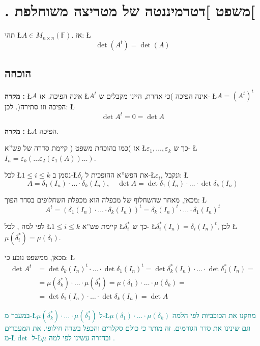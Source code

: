 \documentclass[english,hebrew]{article}
\begin{document}
\section{{\endL}. משפט {]}דטרמיננטה של מטריצה משוחלפת{[}}

תהי \L{$A\in M_{n\times n}(\mathbb{F})$}. אז: \L{%
\[
\det(A^{t})=\det(A)
\]
}%

\subsection{הוכחה}

\textbf{מקרה }\textbf{{}\endL}\textbf{:} \L{$A$} אינה הפיכה.
אז \L{$A^{t}$} אינה הפיכה )כי אחרת, היינו מקבלים ש- \L{$A=(A^{t})^{t}$}
הפיכה וזו סתירה(. לכן: \L{%
\[
\det A^{t}=0=\det A
\]
}%

\textbf{מקרה }\textbf{{}\endL}\textbf{:} \L{$A$} הפיכה.

אז )כמו בהוכחת משפט {\endL}( קיימת סדרה של פש\textquotedblright א
\L{$\varepsilon_{1},\dots,\varepsilon_{k}$} כך ש- \L{$I_{n}=\varepsilon_{k}(\dots\varepsilon_{2}(\varepsilon_{1}(A))\dots)$}. 

לכל \L{$1\le i\le k$} נסמן ב-\L{$\delta_{i}$} את הפש\textquotedblright א
ההופכית ל-\L{$\varepsilon_{i}$}, ונקבל: \L{%
\[
A=\delta_{1}(I_{n})\cdot\dots\cdot\delta_{k}(I_{n}),\quad\det A=\det\delta_{1}(I_{n})\cdot\dots\cdot\det\delta_{k}(I_{n})
\]
}%

מכאן, מאחר שהשחלוף של מכפלה הוא מכפלת השחלופים בסדר הפוך: \L{%
\[
A^{t}=\left(\delta_{1}(I_{n})\cdot\dots\cdot\delta_{k}(I_{n})\right)^{t}=\delta_{k}(I_{n})^{t}\cdot\dots\cdot\delta_{1}(I_{n})^{t}
\]
}%

לפי למה {\endL}, לכל \L{$1\le i\le k$} קיימת פש\textquotedblright א
\L{$\delta_{i}^{*}$} כך ש- \L{$\delta_{i}^{*}(I_{n})=\delta_{i}(I_{n})^{t}$},
לכן \L{$\mu(\delta_{i}^{*})=\mu(\delta_{i})$}.

מכאן, ממשפט {\endL} נובע כי: \L{%
\begin{align*}
\det A^{t} & =\det\delta_{k}(I_{n})^{t}\cdot\dots\cdot\det\delta_{1}(I_{n})^{t}=\det\delta_{k}^{*}(I_{n})\cdot\dots\cdot\det\delta_{1}^{*}(I_{n})=\\
 & =\mu(\delta_{k}^{*})\cdot\dots\cdot\mu(\delta_{1}^{*})=\mu(\delta_{1})\cdot\dots\cdot\mu(\delta_{k})=\\
 & =\det\delta_{1}(I_{n})\cdot\dots\cdot\det\delta_{k}(I_{n})=\det A
\end{align*}
}%

\textcolor{teal}{במעבר מ-\L{$\mu(\delta_{k}^{*})\cdot\dots\cdot\mu(\delta_{1}^{*})$}
ל-\L{$\mu(\delta_{1})\cdot\dots\cdot\mu(\delta_{k})$} מחקנו את הכוכביות
לפי הלמה וגם שינינו את סדר הגורמים. זה מותר כי כולם סקלרים והכפל בשדה
חילופי. את המעברים מ-\L{$\det$} ל-\L{$\mu$} ובחזרה עשינו לפי למה
}\textcolor{teal}{{}\endL}\textcolor{teal}{.}
\end{document}
